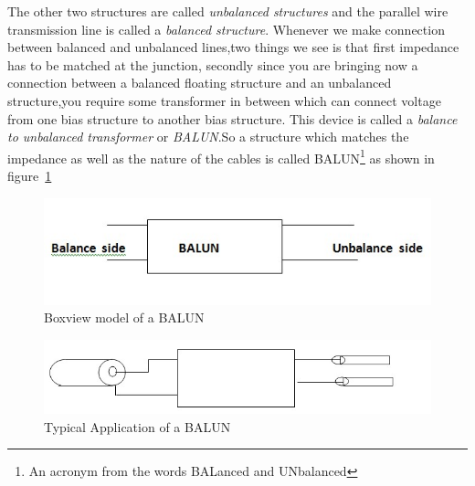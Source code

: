 The other two structures are called \emph{unbalanced structures} and the parallel wire transmission line is called a \emph{balanced structure}. Whenever we make connection between balanced and unbalanced lines,two things we see is that first impedance has to be matched at the junction, secondly since you are bringing now a connection between a balanced floating structure and an unbalanced structure,you require some transformer in between which can connect voltage from one bias structure to another bias structure. This device is called a \emph{balance to unbalanced transformer} or \emph{BALUN}.So a structure which matches the impedance as well as the nature of the cables is called BALUN\footnote{
An acronym from the words BALanced and UNbalanced
} as shown in figure~\ref{fig:balun}
\begin{figure}[h]
\centering
\includegraphics[width=1\linewidth]{./graphics/balun}
\caption{Boxview model of a BALUN}
\label{fig:balun}
\end{figure}
\begin{figure}[h]
\centering
\includegraphics[width=1\linewidth]{./graphics/balun2}
\caption{Typical Application of a BALUN}
\label{fig:balun2}
\end{figure}

